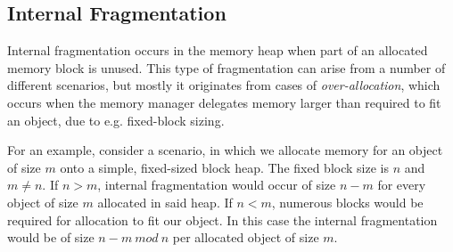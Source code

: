 \subsection{Internal Fragmentation}
\label{subsec:internal-fragmentation}
Internal fragmentation occurs in the memory heap when part of an allocated memory block is unused. This type of fragmentation can arise from a number of different scenarios, but mostly it originates from cases of \textit{over-allocation}, which occurs when the memory manager delegates memory larger than required to fit an object, due to e.g. fixed-block sizing. 

For an example, consider a scenario, in which we allocate memory for an object of size $m$ onto a simple, fixed-sized block heap. The fixed block size is $n$ and $m \neq n$. If $n > m$, internal fragmentation would occur of size $n-m$ for every object of size $m$ allocated in said heap. If $n < m$, numerous blocks would be required for allocation to fit our object. In this case the internal fragmentation would be of size $n - m\ mod\ n$ per allocated object of size $m$.

